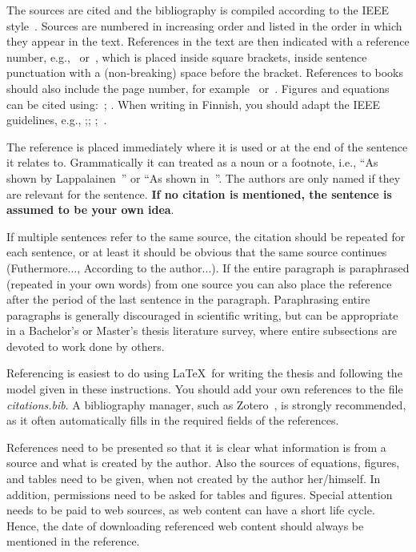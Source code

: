 The sources are cited and the bibliography is compiled according to
the IEEE style~\cite{ieeetransactions}.  Sources are numbered in
increasing order and listed in the order in which they appear in the
text.  References in the text are then indicated with a reference
number, e.g.,~\cite{lappalainen} or~\cite{lappalainen, acta, korpela},
which is placed inside square brackets, inside sentence punctuation
with a (non-breaking) space before the bracket. References to books
should also include the page number, for
example~\cite[p.~15]{lappalainen} or~\cite[pp.~15--17]{lappalainen}.
Figures and equations can be cited using:~\cite[Fig.~3]{lappalainen};
\cite[eq.~(3)]{lappalainen}. When writing in Finnish, you should adapt the IEEE guidelines, e.g., \cite[s.~15]{lappalainen};\cite[s.~15--17]{lappalainen};
\cite[Kuva~3]{lappalainen};~\cite[Yhtälö~(3)]{lappalainen}.

The reference is placed immediately where it is used or at the end of
the sentence it relates to. Grammatically it can treated as a noun or
a footnote, i.e., ``As shown by Lappalainen~\cite{lappalainen}'' or
``As shown in~\cite{lappalainen}''. The authors are only named if they
are relevant for the sentence. \textbf{If no citation is mentioned,
the sentence is assumed to be your own idea}.

If multiple sentences refer to the same source, the citation should be
repeated for each sentence, or at least it should be obvious that the
same source continues (Futhermore..., According to the author...).
If the entire paragraph is paraphrased (repeated in your own words)
from one source you can also place the reference after the period of
the last sentence in the paragraph. Paraphrasing entire paragraphs is
generally discouraged in scientific writing, but can be appropriate in
a Bachelor's or Master's thesis literature survey, where entire
subsections are devoted to work done by others.~\cite{lappalainen}

Referencing is easiest to do using \LaTeX\ for writing the thesis and
following the model given in these instructions. You should add your
own references to the file \textit{citations.bib}. A bibliography
manager, such as Zotero~\cite{zotero,uniouluzotero}, is strongly
recommended, as it often automatically fills in the required fields
of the references. 

References need to be presented so that it is clear what information
is from a source and what is created by the author. Also the sources
of equations, figures, and tables need to be given, when not created
by the author her/himself. In addition, permissions need to be asked
for tables and figures. Special attention needs to be paid to web
sources, as web content can have a short life cycle. Hence, the date
of downloading referenced web content should always be mentioned in
the reference.

